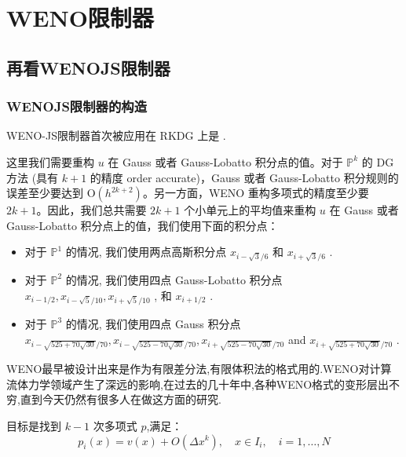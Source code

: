 \documentclass{book}
\begin{document}
\section{WENO限制器}

\subsection{再看WENOJS限制器}

\subsubsection{WENOJS限制器的构造}
WENO-JS限制器首次被应用在 RKDG 上是 \cite{RKDG+WENOJS-1,RKDG+WENOJS-2}.



这里我们需要重构 $u$ 在 Gauss 或者 Gauss-Lobatto 积分点的值。对于 $\mathbb{P}^{k}$ 的 DG 方法 (具有 $k+1$ 的精度 order accurate)，Gauss 或者 Gauss-Lobatto 积分规则的误差至少要达到 $\mathrm{O}\left(h^{2 k+2}\right)$。另一方面，WENO 重构多项式的精度至少要 $2 k+1$。因此，我们总共需要 $2k+1$ 个小单元上的平均值来重构 $u$ 在 Gauss 或者 Gauss-Lobatto 积分点上的值，我们使用下面的积分点：

\begin{itemize}
    \item 对于  $\mathbb{P}^{1}$  的情况, 我们使用两点高斯积分点  $x_{i-\sqrt{3} / 6}$  和  $x_{i+\sqrt{3} / 6}$ .
    \item 对于  $\mathbb{P}^{2}$  的情况, 我们使用四点 Gauss-Lobatto 积分点  $x_{i-1 / 2}, x_{i-\sqrt{5} / 10}, x_{i+\sqrt{5} / 10}$ , 和  $x_{i+1 / 2}$ .
    \item 对于  $\mathbb{P}^{3}$  的情况, 我们使用四点 Gauss 积分点  $x_{i-\sqrt{525+70 \sqrt{30}} / 70}, x_{i-\sqrt{525-70 \sqrt{30}} / 70}, x_{i+\sqrt{525-70 \sqrt{30}} / 70}$  and  $x_{i+\sqrt{525+70 \sqrt{30}} / 70}$ .
\end{itemize}

WENO最早被设计出来是作为有限差分法,有限体积法的格式用的.WENO对计算流体力学领域产生了深远的影响,在过去的几十年中,各种WENO格式的变形层出不穷,直到今天仍然有很多人在做这方面的研究.

目标是找到 $k-1$ 次多项式 $p$,满足：
\begin{equation}
    p_{i}(x)=v(x)+O\left(\Delta x^{k}\right), \quad x \in I_{i}, \quad i=1, \ldots, N
\end{equation}
\end{document}
